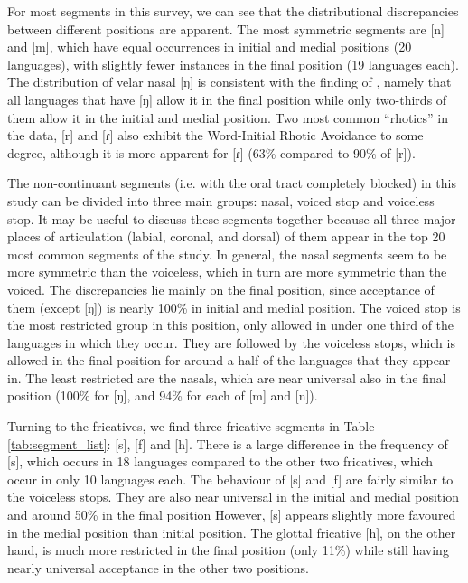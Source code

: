 \par
For most segments in this survey, we can see that the distributional discrepancies between different positions are apparent. 
The most symmetric segments are [n] and [m], which have equal occurrences in initial and medial positions (20 languages), with slightly fewer instances in the final position (19 languages each). 
The distribution of velar nasal [ŋ] is consistent with the finding of \citet{wals-9}, namely that all languages that have [ŋ] allow it in the final position while only two-thirds of them allow it in the initial and medial position. 
Two most common ``rhotics'' in the data, [r] and [ɾ] also exhibit the Word-Initial Rhotic Avoidance to some degree, although it is more apparent for [ɾ] (63\% compared to 90\% of [r]).

\par
The non-continuant segments (i.e. with the oral tract completely blocked) in this study can be divided into three main groups: nasal, voiced stop and voiceless stop. 
It may be useful to discuss these segments together because all three major places of articulation (labial, coronal, and dorsal) of them appear in the top 20 most common segments of the study. 
In general, the nasal segments seem to be more symmetric than the voiceless, which in turn are more symmetric than the voiced.
The discrepancies lie mainly on the final position, since acceptance of them (except [ŋ]) is nearly 100\% in initial and medial position.
The voiced stop is the most restricted group in this position, only allowed in under one third of the languages in which they occur. 
They are followed by the voiceless stops, which is allowed in the final position for around a half of the languages that they appear in. 
The least restricted are the nasals, which are near universal also in the final position (100\% for [ŋ], and 94\% for each of [m] and [n]).


\par
Turning to the fricatives, we find three fricative segments in Table \ref{tab:segment_list}: [s], [f] and [h]. 
There is a large difference in the frequency of [s], which occurs in 18 languages compared to the other two fricatives, which occur in only 10 languages each. 
The behaviour of [s] and [f] are fairly similar to the voiceless stops. 
They are also near universal in the initial and medial position and  around 50\% in the final position
However, [s] appears slightly more favoured in the medial position than initial position. 
The glottal fricative [h], on the other hand, is much more restricted in the final position (only 11\%) while still having nearly universal acceptance in the other two positions.

